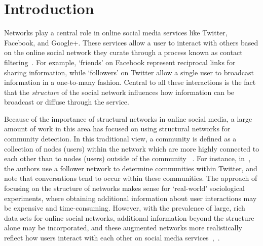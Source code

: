 \section{Introduction}

Networks play a central role in online social media services like Twitter, Facebook, and Google+. These services allow a user to interact with others based on the online social network they curate through a process known as contact filtering~\cite{cazabet2012automated}. For example, `friends' on Facebook represent reciprocal links for sharing information, while `followers' on Twitter allow a single user to broadcast information in a one-to-many fashion. Central to all these interactions is the fact that the \emph{structure} of the social network influences how information can be broadcast or diffuse through the service.

Because of the importance of structural networks in online social media, a large amount of work in this area has focused on using structural networks for community detection. In this traditional view, a community is defined as a collection of nodes (users) within the network which are more highly connected to each other than to nodes (users) outside of the community 
~\cite{girvan2002a, newman2004finding}. For instance, in~\cite{java2009we}, the authors use a follower network to determine communities within Twitter, and note that conversations tend to occur within these communities. The approach of focusing on the structure of networks makes sense for `real-world' sociological experiments, where obtaining additional information about user interactions may be expensive and time-consuming. However, with the prevalence of large, rich data sets for online social networks, additional information beyond the structure alone may be incorporated, and these augmented networks more realistically reflect how users interact with each other on social media services~\cite{nguyen2011adaptive},~\cite{grabowicz2012social}.

